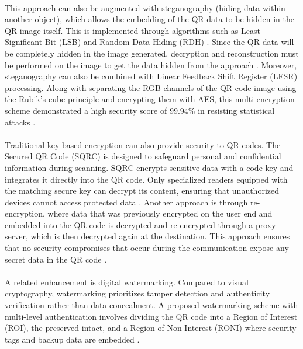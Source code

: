 \documentclass[a4paper]{scl-article}
\begin{document}
\paragraph{}This approach can also be augmented with steganography (hiding data within another object), which allows the embedding of the QR data to be hidden in the QR image itself. This is implemented through algorithms such as Least Significant Bit (LSB) and Random Data Hiding (RDH) \cite{bhardwaj2024}. Since the QR data will be completely hidden in the image generated, decryption and reconstruction must be performed on the image to get the data hidden from the approach \cite{ibrahim2021}. Moreover, steganography can also be combined with Linear Feedback Shift Register (LFSR) processing. Along with separating the RGB channels of the QR code image using the Rubik’s cube principle and encrypting them with AES, this multi-encryption scheme demonstrated a high security score of 99.94\% in resisting statistical attacks \cite{narayanan2024}.

\paragraph{}Traditional key-based encryption can also provide security to QR codes. The Secured QR Code (SQRC) is designed to safeguard personal and confidential information during scanning. SQRC encrypts sensitive data with a code key and integrates it directly into the QR code. Only specialized readers equipped with the matching secure key can decrypt its content, ensuring that unauthorized devices cannot access protected data \cite{saranya2016}. Another approach is through re-encryption, where data that was previously encrypted on the user end and embedded into the QR code is decrypted and re-encrypted through a proxy server, which is then decrypted again at the destination. This approach ensures that no security compromises that occur during the communication expose any secret data in the QR code \cite{akhil2016}.

\paragraph{}A related enhancement is digital watermarking. Compared to visual cryptography, watermarking prioritizes tamper detection and authenticity verification rather than data concealment. A proposed watermarking scheme with multi-level authentication involves dividing the QR code into a Region of Interest (ROI), the preserved intact, and a Region of Non-Interest (RONI) where security tags and backup data are embedded \cite{lei2021}.
\end{document}
